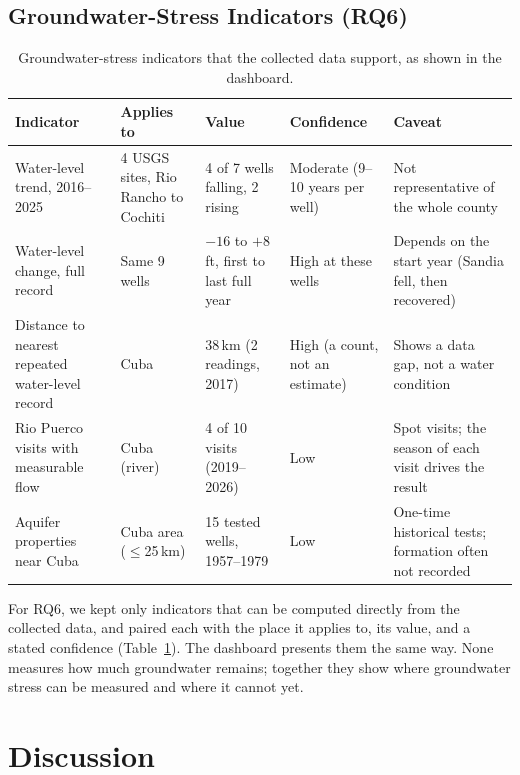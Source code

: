 \documentclass[10pt,twocolumn,letterpaper]{article}
\begin{document}
\subsection{Groundwater-Stress Indicators (RQ6)}
\begin{table}[t]
  \caption{Groundwater-stress indicators that the collected data support, as shown in the
  dashboard.}
  \label{tab:indicators}
  \footnotesize
  \begin{tabularx}{\textwidth}{@{}>{\raggedright}p{1.35in}>{\raggedright}p{1.25in}>{\raggedright}p{1.25in}>{\raggedright}p{0.95in}>{\raggedright\arraybackslash}X@{}}
    \toprule
    \textbf{Indicator} & \textbf{Applies to} & \textbf{Value} & \textbf{Confidence} & \textbf{Caveat} \\
    \midrule
    Water-level trend, 2016--2025 & 4 USGS sites, Rio Rancho to Cochiti & 4 of 7 wells falling,
      2 rising & Moderate (9--10 years per well) & Not representative of the whole county \\
    Water-level change, full record & Same 9 wells & $-16$ to $+8$\,ft, first to last full year &
      High at these wells & Depends on the start year (Sandia fell, then recovered) \\
    Distance to nearest repeated water-level record & Cuba & 38\,km (2 readings, 2017) & High (a
      count, not an estimate) & Shows a data gap, not a water condition \\
    Rio Puerco visits with measurable flow & Cuba (river) & 4 of 10 visits (2019--2026) & Low &
      Spot visits; the season of each visit drives the result \\
    Aquifer properties near Cuba & Cuba area ($\leq$25\,km) & 15 tested wells, 1957--1979 & Low &
      One-time historical tests; formation often not recorded \\
    \bottomrule
  \end{tabularx}
\end{table}
For RQ6, we kept only indicators that can be computed directly from the collected data, and paired
each with the place it applies to, its value, and a stated confidence (Table~\ref{tab:indicators}).
The dashboard presents them the same way. None measures how much groundwater remains; together they
show where groundwater stress can be measured and where it cannot yet.

\section{Discussion}\label{sec:discussion}
\end{document}

